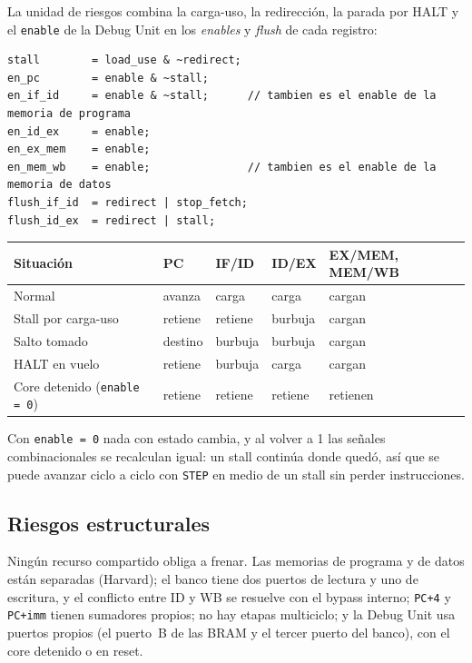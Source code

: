 La unidad de riesgos combina la carga-uso, la redirección, la parada por HALT y el
\texttt{enable} de la Debug Unit en los \emph{enables} y \emph{flush} de cada registro:

\begin{lstlisting}[style=verilog,numbers=none]
stall        = load_use & ~redirect;
en_pc        = enable & ~stall;
en_if_id     = enable & ~stall;      // tambien es el enable de la memoria de programa
en_id_ex     = enable;
en_ex_mem    = enable;
en_mem_wb    = enable;               // tambien es el enable de la memoria de datos
flush_if_id  = redirect | stop_fetch;
flush_id_ex  = redirect | stall;
\end{lstlisting}

\begin{center}
\small
\begin{tabular}{@{}l l l l l@{}}
  \toprule
  \textbf{Situación} & \textbf{PC} & \textbf{IF/ID} & \textbf{ID/EX} & \textbf{EX/MEM, MEM/WB} \\
  \midrule
  Normal                      & avanza & carga & carga & cargan \\
  Stall por carga-uso         & retiene & retiene & burbuja & cargan \\
  Salto tomado                & destino & burbuja & burbuja & cargan \\
  HALT en vuelo               & retiene & burbuja & carga & cargan \\
  Core detenido (\texttt{enable = 0}) & retiene & retiene & retiene & retienen \\
  \bottomrule
\end{tabular}
\end{center}

Con \texttt{enable = 0} nada con estado cambia, y al volver a 1 las señales combinacionales se
recalculan igual: un stall continúa donde quedó, así que se puede avanzar ciclo a ciclo con
\texttt{STEP} en medio de un stall sin perder instrucciones.

\subsection{Riesgos estructurales}

Ningún recurso compartido obliga a frenar. Las memorias de programa y de datos están separadas
(Harvard); el banco tiene dos puertos de lectura y uno de escritura, y el conflicto entre ID y WB
se resuelve con el bypass interno; \texttt{PC+4} y \texttt{PC+imm} tienen sumadores propios; no
hay etapas multiciclo; y la Debug Unit usa puertos propios (el puerto~B de las BRAM y el tercer
puerto del banco), con el core detenido o en reset.
